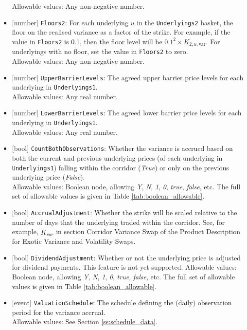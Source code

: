 \begin{itemize}
  Allowable values: Any non-negative number.
  \item{}[number] \lstinline!Floors2!: For each underlying $u$ in the \lstinline!Underlyings2! basket, the floor on the realised
  variance as a factor of the strike. For example, if the value in \lstinline!Floors2! is 0.1, then the floor level will
  be $0.1^2 \times K_{2,u,\text{var}}$. For underlyings with no floor, set the value in \lstinline!Floors2! to zero. \\
  Allowable values: Any non-negative number.
  \item{}[number] \lstinline!UpperBarrierLevels!: The agreed upper barrier price levels for each underlying in \lstinline!Underlyings1!. \\
  Allowable values: Any real number.
  \item{}[number] \lstinline!LowerBarrierLevels!: The agreed lower barrier price levels for each underlying in \lstinline!Underlyings1!. \\
  Allowable values: Any real number.
  \item{}[bool] \lstinline!CountBothObservations!: Whether the variance is accrued based on both the current and
  previous underlying prices (of each underlying in \lstinline!Underlyings1!) falling within the corridor (\emph{True})
  or only on the previous underlying price (\emph{False}). \\
  Allowable values: Boolean node, allowing \emph{Y}, \emph{N}, \emph{1}, \emph{0}, \emph{true}, \emph{false}, etc.
  The full set of allowable values is given in Table \ref{tab:boolean_allowable}.
  \item{}[bool] \lstinline!AccrualAdjustment!: Whether the strike will be scaled relative to the number of days that the
  underlying traded within the corridor. See, for example, $\widetilde{K}_{var}$ in section Corridor Variance Swap
  of the Product Description for Exotic Variance and Volatility Swaps.
  \item{}[bool] \lstinline!DividendAdjustment!: Whether or not the underlying price is adjusted for dividend payments. This feature is
  not yet supported.
  Allowable values: Boolean node, allowing \emph{Y}, \emph{N}, \emph{1}, \emph{0}, \emph{true}, \emph{false}, etc.
  The full set of allowable values is given in Table \ref{tab:boolean_allowable}.
  \item{}[event] \lstinline!ValuationSchedule!: The schedule defining the (daily) observation period for the variance accrual. \\
  Allowable values: See Section \ref{ss:schedule_data}.

\end{itemize}
